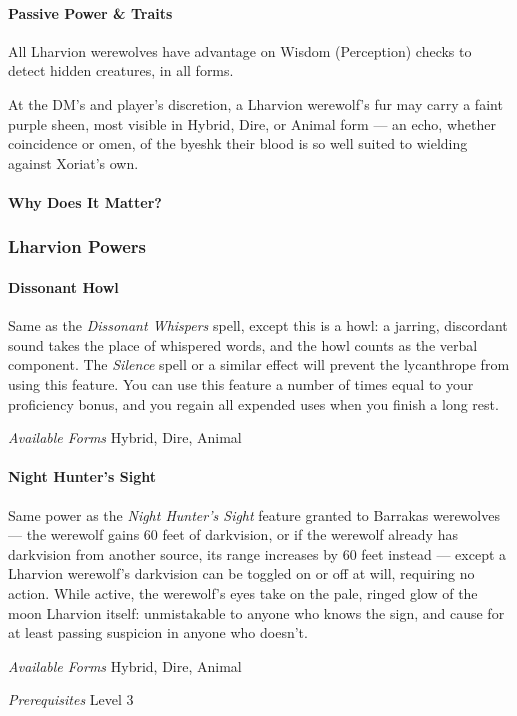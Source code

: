 \documentclass[twocolumn]{dndbook}
\begin{document}
\paragraph*{Passive Power \& Traits} All Lharvion werewolves have advantage on Wisdom (Perception) checks to detect hidden creatures, in all forms.\par

At the DM's and player's discretion, a Lharvion werewolf's fur may carry a faint purple sheen, most visible in Hybrid, Dire, or Animal form --- an echo, whether coincidence or omen, of the byeshk their blood is so well suited to wielding against Xoriat's own.\par

\paragraph*{Why Does It Matter?}

\subsubsection{Lharvion Powers}

\paragraph*{Dissonant Howl}
Same as the \emph{Dissonant Whispers} spell, except this is a howl: a jarring, discordant sound takes the place of whispered words, and the howl counts as the verbal component.
The \emph{Silence} spell or a similar effect will prevent the lycanthrope from using this feature.
You can use this feature a number of times equal to your proficiency bonus, and you regain all expended uses when you finish a long rest.\par
\emph{Available Forms} Hybrid, Dire, Animal\par

\paragraph*{Night Hunter's Sight}
Same power as the \emph{Night Hunter's Sight} feature granted to Barrakas werewolves --- the werewolf gains 60 feet of darkvision, or if the werewolf already has darkvision from another source, its range increases by 60 feet instead --- except a Lharvion werewolf's darkvision can be toggled on or off at will, requiring no action.
While active, the werewolf's eyes take on the pale, ringed glow of the moon Lharvion itself: unmistakable to anyone who knows the sign, and cause for at least passing suspicion in anyone who doesn't.\par
\emph{Available Forms} Hybrid, Dire, Animal\par
\emph{Prerequisites} Level 3\par
\end{document}
